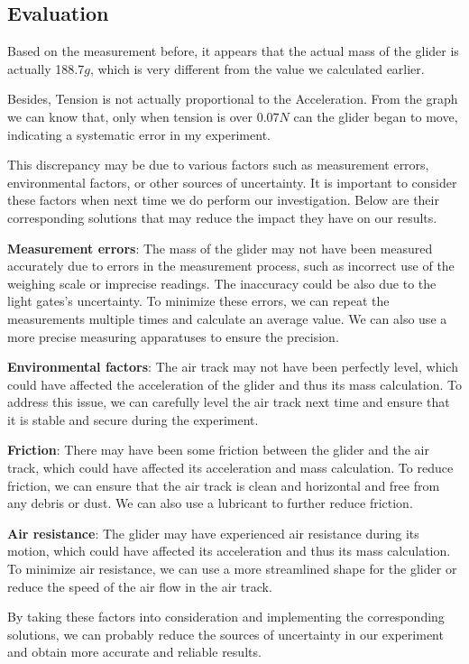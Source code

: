 \documentclass[12pt,a4paper]{article}
\begin{document}
\subsection{Evaluation}
Based on the measurement before, it appears that the actual mass of the glider is actually 188.7$g$, which is very different from the value we calculated earlier.\par
Besides, Tension is not actually proportional to the Acceleration. From the graph we can know that, only when tension is over $ 0.07N $ can the glider began to move, indicating a systematic error in my experiment.\par
This discrepancy may be due to various factors such as measurement errors, environmental factors, or other sources of uncertainty. It is important to consider these factors when next time we do perform our investigation. Below are their corresponding solutions that may reduce the impact they have on our results.\par
\textbf{Measurement errors}: The mass of the glider may not have been measured accurately due to errors in the measurement process, such as incorrect use of the weighing scale or imprecise readings. The inaccuracy could be also due to the light gates's uncertainty. To minimize these errors, we can repeat the measurements multiple times and calculate an average value. We can also use a more precise measuring apparatuses to ensure the precision.\par
\textbf{Environmental factors}: The air track may not have been perfectly level, which could have affected the acceleration of the glider and thus its mass calculation. To address this issue, we can carefully level the air track next time and ensure that it is stable and secure during the experiment.\par
\textbf{Friction}: There may have been some friction between the glider and the air track, which could have affected its acceleration and mass calculation. To reduce friction, we can ensure that the air track is clean and horizontal and free from any debris or dust. We can also use a lubricant to further reduce friction.\par
\textbf{Air resistance}: The glider may have experienced air resistance during its motion, which could have affected its acceleration and thus its mass calculation. To minimize air resistance, we can use a more streamlined shape for the glider or reduce the speed of the air flow in the air track.\par
By taking these factors into consideration and implementing the corresponding solutions, we can probably reduce the sources of uncertainty in our experiment and obtain more accurate and reliable results.\par
\end{document}
